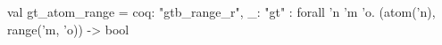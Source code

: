 val gt_atom_range = {coq: "gtb_range_r", _: "gt"}     : forall 'n 'm 'o. (atom('n), range('m, 'o)) -> bool
